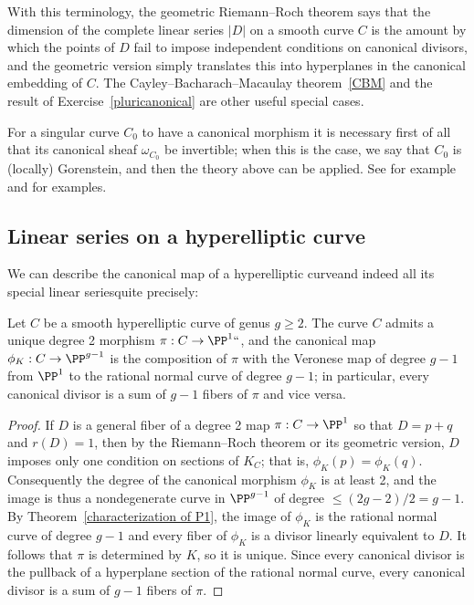 With this terminology, the geometric Riemann--Roch theorem says that 
the dimension of the complete linear series $|D|$ on a smooth curve $C$
is the amount by which the points of $D$ fail to impose independent conditions
on canonical divisors, and the geometric version simply translates this into 
 hyperplanes in the canonical embedding of $C$. 
%
The Cayley--Bacharach--Macaulay
theorem~\ref{CBM} and the result of 
Exercise~\ref{pluricanonical} are other useful
special cases.

\begin{remark}
For a singular curve $C_0$ to have a canonical morphism it is necessary first of all that its canonical sheaf
 $\omega_{C_0}$ be invertible; when this is the case, we say that $C_0$ is (locally) Gorenstein, and then
%
%
the theory above can be applied. See for example \cite{graphcurves} and \cite{ribbons} for examples. 
\end{remark}

\subsection*{Linear series on a hyperelliptic curve}
We can describe the canonical map of a hyperelliptic curve\emdash and indeed all its special linear series\emdash quite precisely:

\begin{corollary}\label{canonical on hyperelliptic}
Let $C$ be a smooth hyperelliptic curve of genus $g\geq 2$. The curve $C$ admits a unique degree 2 morphism $\pi: C\to \PP^1` `$,
and the canonical map $\phi_K: C\to \PP^{g-1}$ is the composition of $\pi$ with the Veronese map of degree $g-1$ from
%
$\PP^1$ to the rational normal curve of degree $g-1$; in particular, every canonical divisor is a sum of $g-1$ fibers of $\pi$ and vice versa.
\end{corollary}

\begin{proof}
If $D$ is a general fiber of a degree 2 map $\pi:C\to \PP^1$ so that $D= p+q$ and $r(D) = 1$, then by the Riemann--Roch theorem or its geometric version, $D$ imposes only one condition on sections of $K_C$; that is, $\phi_K(p) = \phi_K(q)$. Consequently the degree of the canonical morphism $\phi_K$ is at least 2, and the image is thus a nondegenerate curve in $\PP^{g-1}$ of degree $\leq (2g-2)/2 = g-1$. By Theorem~\ref{characterization of P1}, the image of $\phi_K$ is the rational normal curve of degree $g-1$ and every fiber of $\phi_K$ is a divisor linearly equivalent to $D$. It follows that $\pi$ is determined by $K$, so it is unique. Since every canonical divisor is the pullback of a hyperplane section of the rational normal curve,
every canonical divisor is a sum of $g-1$ fibers of $\pi$.
\end{proof}

